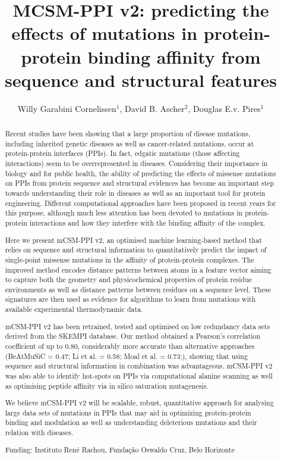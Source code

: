 \documentclass[twoside]{article}
\title{\vspace{-15mm}\fontsize{24pt}{10pt}\selectfont\textbf{MCSM-PPI v2: predicting the effects of mutations in protein-protein binding affinity from sequence and structural features}} %
\author{Willy Garabini Cornelissen$^1$, David B. Ascher$^2$, Douglas E.v. Pires$^1$}
\affil{1 INSTITUTO REN\'E RACHOU, FUNDA\c{C}\~AO OSWALDO CRUZ\\ 2 DEPARTMENT OF BIOCHEMISTRY AND MOLECULAR BIOLOGY, UNIVERSITY OF MELBOURNE, MELBOURNE\\ }
\date{}
\begin{document}
\maketitle %

\thispagestyle{fancy} %


\begin{abstract}
Recent studies have been showing that a large proportion of disease mutations, including inherited genetic diseases as well as cancer-related mutations, occur at protein-protein interfaces (PPIs). In fact, edgatic mutations (those affecting interactions) seem to be overrepresented in diseases. Considering their importance in biology and for public health, the ability of predicting the effects of missense mutations on PPIs from protein sequence and structural evidences has become an important step towards understanding their role in diseases as well as an important tool for protein engineering. Different computational approaches have been proposed in recent years for this purpose, although much less attention has been devoted to mutations in protein-protein interactions and how they interfere with the binding affinity of the complex.

Here we present mCSM-PPI v2, an optimised machine learning-based method that relies on sequence and structural information to quantitatively predict the impact of single-point missense mutations in the affinity of protein-protein complexes. The improved method encodes distance patterns between atoms in a feature vector aiming to capture both the geometry and physicochemical properties of protein residue environments as well as distance patterns between residues on a sequence level. These signatures are then used as evidence for algorithms to learn from mutations with available experimental thermodynamic data.

mCSM-PPI v2 has been retrained,  tested and optimised on low redundancy data sets derived from the SKEMPI database. Our method obtained a Pearson's correlation coefficient of up to 0.80, considerably more accurate than alternative approaches (BeAtMuSiC = 0.47; Li et al. = 0.58; Moal et al. = 0.73;), showing that using sequence and structural information in combination was advantageous. mCSM-PPI v2 was also able to identify hot-spots on PPIs via computational alanine scanning as well as optimising peptide affinity via in silico saturation mutagenesis.

We believe mCSM-PPI v2 will be scalable, robust, quantitative approach for analysing large data sets of mutations in PPIs that may aid in optimizing protein-protein binding and modulation as well as  understanding deleterious mutations and their relation with diseases.

Funding: Instituto Ren\'e Rachou, Funda\c{c}\~ao Oswaldo Cruz, Belo Horizonte
\end{abstract}
\end{document}
